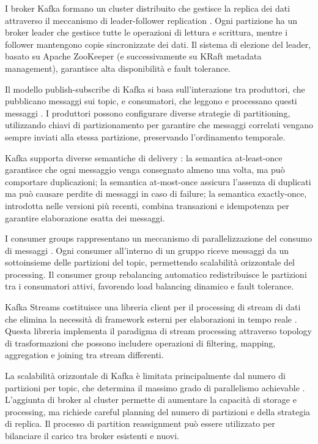 I broker Kafka formano un cluster distribuito che gestisce la replica dei dati attraverso il meccanismo di
leader-follower replication \cite{stopford2018designing}. Ogni partizione ha un broker leader che gestisce tutte le
operazioni di lettura e scrittura, mentre i follower mantengono copie sincronizzate dei dati. Il sistema di elezione
del leader, basato su Apache ZooKeeper (e successivamente su KRaft metadata management),
garantisce alta disponibilità e fault tolerance.

Il modello publish-subscribe di Kafka si basa sull'interazione tra produttori, che pubblicano messaggi sui
topic, e consumatori, che leggono e processano questi messaggi \cite{kreps2014kafka}.
I produttori possono configurare diverse strategie di partitioning, utilizzando chiavi di partizionamento per garantire
che messaggi correlati vengano sempre inviati alla stessa partizione, preservando l'ordinamento temporale.

Kafka supporta diverse semantiche di delivery \cite{narkhede2017kafka}: la semantica at-least-once garantisce che
ogni messaggio venga consegnato almeno una volta, ma può comportare duplicazioni; la semantica at-most-once assicura
l'assenza di duplicati ma può causare perdite di messaggi in caso di failure; la semantica exactly-once,
introdotta nelle versioni più recenti, combina transazioni e idempotenza per garantire elaborazione esatta dei messaggi.

I consumer groups rappresentano un meccanismo di parallelizzazione del consumo di messaggi \cite{garg2013apache}.
Ogni consumer all'interno di un gruppo riceve messaggi da un sottoinsieme delle partizioni del topic,
permettendo scalabilità orizzontale del processing. Il consumer group rebalancing automatico redistribuisce
le partizioni tra i consumatori attivi, favorendo load balancing dinamico e fault tolerance.

Kafka Streams costituisce una libreria client per il processing di stream di dati che elimina la necessità di framework
esterni per elaborazioni in tempo reale \cite{stopford2018designing}. Questa libreria implementa il paradigma di stream
processing attraverso topology di trasformazioni che possono includere operazioni di filtering, mapping,
aggregation e joining tra stream differenti.

La scalabilità orizzontale di Kafka è limitata principalmente dal numero di partizioni per topic, che determina il
massimo grado di parallelismo achievable \cite{narkhede2017kafka}. L'aggiunta di broker al cluster permette
di aumentare la capacità di storage e processing, ma richiede careful planning del numero di partizioni e della
strategia di replica. Il processo di partition reassignment può essere utilizzato per bilanciare il carico
tra broker esistenti e nuovi.

